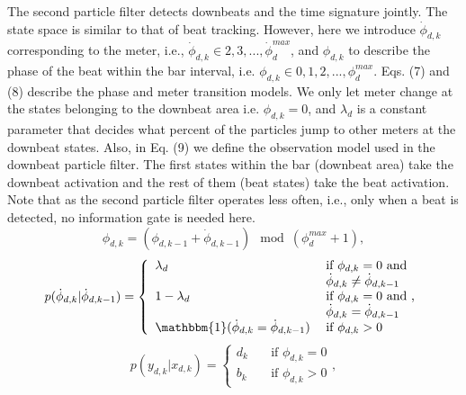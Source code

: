 \documentclass{article}
\begin{document}
The second particle filter detects downbeats and the time signature jointly. The state space is similar to that of beat tracking. However, here we introduce $\dot\phi_{d,k}$ corresponding to the meter, i.e., $\dot\phi_{d,k} \in {2,3,...,\dot\phi_{d}^{max}}$, and $\phi_{d,k}$ to describe the phase of the beat within the bar interval, i.e. $\phi_{d,k} \in {0,1,2,...,\phi_{d}^{max}}$. Eqs. (7) and (8) describe the phase and meter transition models. We only let meter change at the states belonging to the downbeat area i.e. $\phi_{d,k}=0$, and $\lambda_{d}$ is a constant parameter that decides what percent of the particles jump to other meters at the downbeat states. Also, in Eq. (9) we define the observation model used in the downbeat particle filter. The first states within the bar (downbeat area) take the downbeat activation and the rest of them (beat states) take the beat activation. Note that as the second particle filter operates less often, i.e., only when a beat is detected, no information gate is needed here.
\begin{equation}
    \phi_{d,k}=(\phi_{d,k-1}+\dot{\phi}_{d,k-1}) \mod (\phi_d^{max}+1),
\end{equation}
\begin{equation}
    p(\dot{\phi}_{d,k} | \dot{\phi}_{d,k-1}) =
      \left\{
        \begin{array}{ll}
            \lambda_{d} & \hspace{0.25em} \text{if } \phi_{d,k}=0 \text{ and}\\ & \hspace{0.25em} \dot{\phi}_{d,k} \neq \dot{\phi}_{d,k-1}\\
            1-\lambda_{d} & \hspace{0.25em} \text{if } \phi_{d,k}=0 \text{ and ,}\\ & \hspace{0.25em} \dot{\phi}_{d,k} = \dot{\phi}_{d,k-1}\\
            \mathbbm{1}(\dot{\phi}_{d,k} = \dot{\phi}_{d,k-1}) & \hspace{0.25em} \text{if } \phi_{d,k} > 0
        \end{array}
      \right.
\end{equation}
\begin{equation}
    p(y_{d,k} | x_{d,k}) =
      \left\{
        \begin{array}{ll}
            d_k & \quad \text{if } \phi_{d,k}=0\\
            b_k & \quad \text{if } \phi_{d,k}>0
        \end{array}
      \right. ,
\end{equation}
\end{document}
